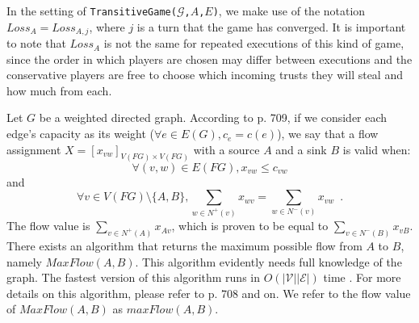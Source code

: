 \documentclass[11pt]{llncs}
\theoremstyle{definition}
\begin{document}
    In the setting of \texttt{TransitiveGame(}$\mathcal{G}$\texttt{,}$A$\texttt{,}$E$\texttt{)}, we make use of the notation
    $Loss_A = Loss_{A, j}$, where $j$ is a turn that the game has converged. It is important to note that $Loss_A$ is
    not the same for repeated executions of this kind of game, since the order in which players are chosen may differ between
    executions and the conservative players are free to choose which incoming trusts they will steal and how much from each.

    Let $G$ be a weighted directed graph. According to \cite{clrs} p. 709, if we consider each edge's capacity as its weight
    ($\forall e \in E(G), c_e = c(e)$), we say that a flow assignment $X = [x_{vw}]_{V(FG) \times V(FG)}$ with a source $A$
    and a sink $B$ is valid when:
    \begin{equation}
    \label{flow1}
       \forall (v, w) \in E(FG), x_{vw} \leq c_{vw}
    \end{equation}
    and
    \begin{equation}
    \label{flow2}
       \forall v \in V(FG) \setminus \{A,B\}, \sum\limits_{w \in N^{+}(v)}x_{wv} = \sum\limits_{w \in N^{-}(v)}x_{vw}
       \enspace.
    \end{equation}
    The flow value is $\sum\limits_{v \in N^{+}\left(A\right)}x_{Av}$, which is proven to be equal to
    $\sum\limits_{v \in N^{-}\left(B\right)}x_{vB}$. There exists an algorithm that returns the maximum possible flow from
    $A$ to $B$, namely $MaxFlow\left(A, B\right)$. This algorithm evidently needs full knowledge of the graph. The fastest
    version of this algorithm runs in $O\left(|\mathcal{V}||\mathcal{E}|\right)$ time \cite{maxflownm}. For more details on
    this algorithm, please refer to \cite{clrs} p. 708 and on. We refer to the flow value of $MaxFlow\left(A, B\right)$ as
    $maxFlow\left(A, B\right)$.
\end{document}
